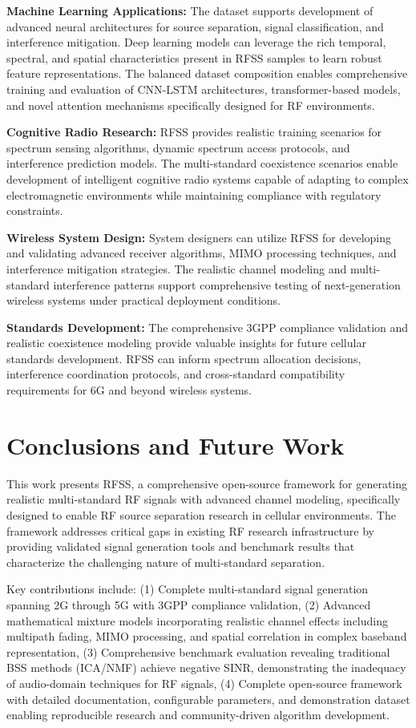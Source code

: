 \documentclass[twocolumn]{article}
\begin{document}
\textbf{Machine Learning Applications:} The dataset supports development of advanced neural architectures for source separation, signal classification, and interference mitigation. Deep learning models can leverage the rich temporal, spectral, and spatial characteristics present in RFSS samples to learn robust feature representations. The balanced dataset composition enables comprehensive training and evaluation of CNN-LSTM architectures, transformer-based models, and novel attention mechanisms specifically designed for RF environments.

\textbf{Cognitive Radio Research:} RFSS provides realistic training scenarios for spectrum sensing algorithms, dynamic spectrum access protocols, and interference prediction models. The multi-standard coexistence scenarios enable development of intelligent cognitive radio systems capable of adapting to complex electromagnetic environments while maintaining compliance with regulatory constraints.

\textbf{Wireless System Design:} System designers can utilize RFSS for developing and validating advanced receiver algorithms, MIMO processing techniques, and interference mitigation strategies. The realistic channel modeling and multi-standard interference patterns support comprehensive testing of next-generation wireless systems under practical deployment conditions.

\textbf{Standards Development:} The comprehensive 3GPP compliance validation and realistic coexistence modeling provide valuable insights for future cellular standards development. RFSS can inform spectrum allocation decisions, interference coordination protocols, and cross-standard compatibility requirements for 6G and beyond wireless systems.

\section{Conclusions and Future Work}

This work presents RFSS, a comprehensive open-source framework for generating realistic multi-standard RF signals with advanced channel modeling, specifically designed to enable RF source separation research in cellular environments. The framework addresses critical gaps in existing RF research infrastructure by providing validated signal generation tools and benchmark results that characterize the challenging nature of multi-standard separation.

Key contributions include: (1) Complete multi-standard signal generation spanning 2G through 5G with 3GPP compliance validation, (2) Advanced mathematical mixture models incorporating realistic channel effects including multipath fading, MIMO processing, and spatial correlation in complex baseband representation, (3) Comprehensive benchmark evaluation revealing traditional BSS methods (ICA/NMF) achieve negative SINR, demonstrating the inadequacy of audio-domain techniques for RF signals, (4) Complete open-source framework with detailed documentation, configurable parameters, and demonstration dataset enabling reproducible research and community-driven algorithm development.
\end{document}
